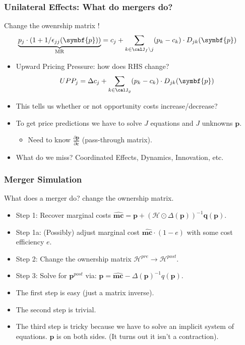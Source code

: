 \begin{frame}
\frametitle{Unilateral Effects: What do mergers do?}
Change the owenrship matrix !
\begin{align*}
\underbrace{p_j\cdot\left(1+1/\epsilon_{jj}(\symbf{p})\right)}_{\text{MR}} &=  c_j + \sum_{k \in \calJ_{f} \setminus j}  (p_k-c_k) \cdot  D_{jk} (\symbf{p})
\end{align*}
\begin{itemize}
    \item \alert{Upward Pricing Pressure}: how does RHS change?
     $$UPP_j = \Delta c_j + \sum_{k \in \calJ_{g}}  (p_k-c_k) \cdot  D_{jk} (\symbf{p})$$
     \item This tells us whether or not \alert{opportunity costs} increase/decrease?
     \item To get price predictions we have to solve $J$ equations and $J$ unknowns $\symbf{p}$.
     \begin{itemize}
        \item Need to know $\frac{\partial \symbf{p}}{\partial \symbf{c}}$ (pass-through matrix).
    \end{itemize}
    \item What do we miss? \alert{Coordinated Effects}, \alert{Dynamics}, \alert{Innovation}, etc.
\end{itemize}
\end{frame}



\begin{frame}
\frametitle{Merger Simulation}
What does a merger do? \alert{change the ownership matrix}.
\begin{itemize}

\item Step 1: Recover marginal costs $\widehat{\symbf{mc}} = \symbf{p} +(\mathcal{H} \odot \Delta(\symbf{p}))^{-1} \symbf{q}(\symbf{p})$.
\item Step 1a: (Possibly) adjust marginal cost $\widehat{\symbf{mc}}\cdot (1-e)$ with some cost efficiency $e$.
\item Step 2: Change the ownership matrix $\mathcal{H}^{pre} \rightarrow \mathcal{H}^{post}$.
\item Step 3: Solve for $\symbf{p}^{post}$ via: $\symbf{p} = \widehat{\symbf{mc}} - \Delta(\symbf{p})^{-1}q(\symbf{p})$.
\end{itemize}
\pause
\vspace{0.5cm}
\begin{itemize}
\item The first step is easy (just a matrix inverse).
\item The second step is trivial.
\item The third step is tricky because we have to solve an implicit system of equations. $\symbf{p}$ is on both sides. (It turns out it isn't a contraction).
\end{itemize}
\end{frame}



